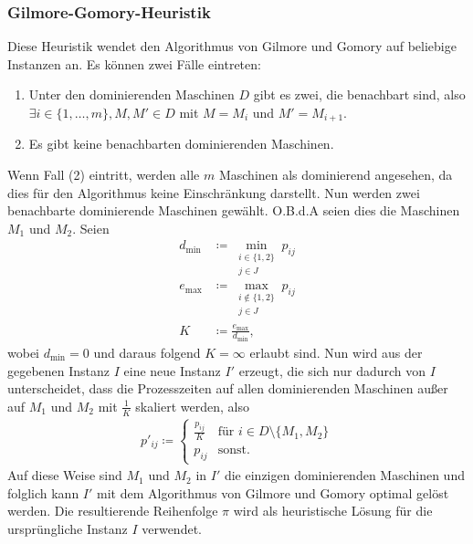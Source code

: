 \documentclass{scrreprt}
\begin{document}
\subsubsection{Gilmore-Gomory-Heuristik}
\label{subsubsec:ggHeuristik}
Diese Heuristik wendet den Algorithmus von Gilmore und Gomory auf beliebige Instanzen an.
Es können zwei Fälle eintreten:
\begin{enumerate}
    \item Unter den dominierenden Maschinen $D$ gibt es zwei, die benachbart sind, also $\exists i\in\{1,\ldots,m\}, M,M'\in D$ mit $M=M_i$ und $M'=M_{i+1}$.
    \item Es gibt keine benachbarten dominierenden Maschinen.
\end{enumerate}
Wenn Fall (2) eintritt, werden alle $m$ Maschinen als dominierend angesehen, da dies für den Algorithmus keine Einschränkung darstellt.
Nun werden zwei benachbarte dominierende Maschinen gewählt.
O.B.d.A seien dies die Maschinen $M_1$ und $M_2$. Seien 
\begin{align} 
    d_{\min} &\coloneqq \min_{\substack{i\in \{1,2\} \\ j\in J}} p_{ij} \\
    e_{\max} &\coloneqq \max_{\substack{i\not\in \{1,2\} \\ j\in J}} p_{ij} \\
    K &\coloneqq \frac{e_{\max}}{d_{\min}} \text{,}
\end{align}
wobei $d_{\min}=0$ und daraus folgend $K=\infty$ erlaubt sind. 
Nun wird aus der gegebenen Instanz $I$ eine neue Instanz $I'$ erzeugt, die sich nur dadurch von $I$ unterscheidet, dass die Prozesszeiten
auf allen dominierenden Maschinen außer auf $M_1$ und $M_2$ mit $\frac{1}{K}$ skaliert werden, also
\begin{align}
    p'_{ij} \coloneqq \begin{cases} \frac{p_{ij}}{K} &\text{für } i\in D\setminus\{M_1,M_2\} \\ p_{ij} &\text{sonst.} \end{cases}
\end{align}
Auf diese Weise sind $M_1$ und $M_2$ in $I'$ die einzigen dominierenden Maschinen und folglich kann $I'$ mit dem Algorithmus von Gilmore und Gomory optimal gelöst werden.
Die resultierende Reihenfolge $\pi$ wird als heuristische Lösung für die ursprüngliche Instanz $I$ verwendet.
\end{document}
